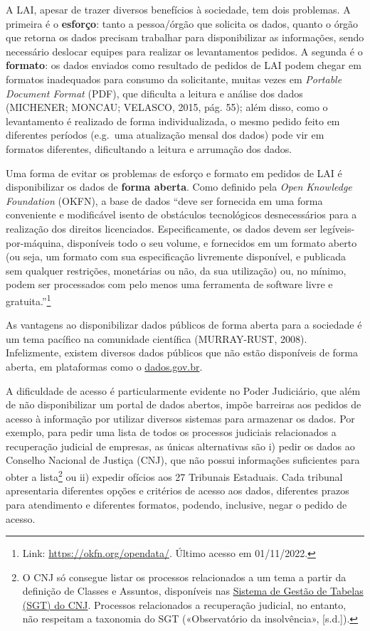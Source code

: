 \documentclass[12pt,twoside,brazilian]{book}
\begin{document}
A LAI, apesar de trazer diversos benefícios à sociedade, tem dois
problemas. A primeira é o \textbf{esforço}: tanto a pessoa/órgão que
solicita os dados, quanto o órgão que retorna os dados precisam
trabalhar para disponibilizar as informações, sendo necessário deslocar
equipes para realizar os levantamentos pedidos. A segunda é o
\textbf{formato}: os dados enviados como resultado de pedidos de LAI
podem chegar em formatos inadequados para consumo da solicitante, muitas
vezes em \emph{Portable Document Format} (PDF), que dificulta a leitura
e análise dos dados (MICHENER; MONCAU; VELASCO, 2015, pág. 55); além
disso, como o levantamento é realizado de forma individualizada, o mesmo
pedido feito em diferentes períodos (e.g.~uma atualização mensal dos
dados) pode vir em formatos diferentes, dificultando a leitura e
arrumação dos dados.

Uma forma de evitar os problemas de esforço e formato em pedidos de LAI
é disponibilizar os dados de \textbf{forma aberta}. Como definido pela
\emph{Open Knowledge Foundation} (OKFN), a base de dados ``deve ser
fornecida em uma forma conveniente e modificável isento de obstáculos
tecnológicos desnecessários para a realização dos direitos licenciados.
Especificamente, os dados devem ser legíveis-por-máquina, disponíveis
todo o seu volume, e fornecidos em um formato aberto (ou seja, um
formato com sua especificação livremente disponível, e publicada sem
qualquer restrições, monetárias ou não, da sua utilização) ou, no
mínimo, podem ser processados com pelo menos uma ferramenta de software
livre e gratuita.''\footnote{Link: \url{https://okfn.org/opendata/}.
  Último acesso em 01/11/2022.}

As vantagens ao disponibilizar dados públicos de forma aberta para a
sociedade é um tema pacífico na comunidade científica (MURRAY-RUST,
2008). Infelizmente, existem diversos dados públicos que não estão
disponíveis de forma aberta, em plataformas como o
\href{https://dados.gov.br}{dados.gov.br}.

A dificuldade de acesso é particularmente evidente no Poder Judiciário,
que além de não disponibilizar um portal de dados abertos, impõe
barreiras aos pedidos de acesso à informação por utilizar diversos
sistemas para armazenar os dados. Por exemplo, para pedir uma lista de
todos os processos judiciais relacionados a recuperação judicial de
empresas, as únicas alternativas são i) pedir os dados ao Conselho
Nacional de Justiça (CNJ), que não possui informações suficientes para
obter a lista\footnote{O CNJ só consegue listar os processos
  relacionados a um tema a partir da definição de Classes e Assuntos,
  disponíveis nas
  \href{https://www.cnj.jus.br/sgt/consulta_publica_classes.php}{Sistema
  de Gestão de Tabelas (SGT) do CNJ}. Processos relacionados a
  recuperação judicial, no entanto, não respeitam a taxonomia do SGT
  ({«Observatório da insolvência»}, {[}s.d.{]}).} ou ii) expedir ofícios
aos 27 Tribunais Estaduais. Cada tribunal apresentaria diferentes opções
e critérios de acesso aos dados, diferentes prazos para atendimento e
diferentes formatos, podendo, inclusive, negar o pedido de acesso.
\end{document}
